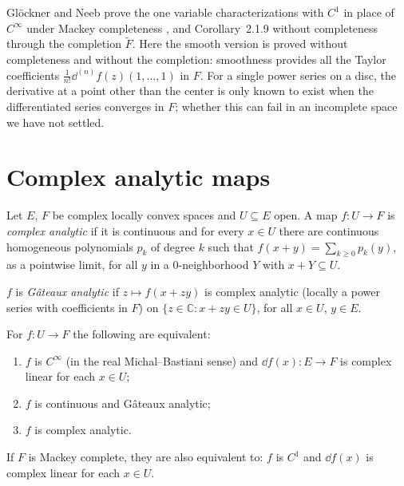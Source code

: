 \begin{remark}
  Glöckner and Neeb prove the one variable characterizations with $C^1$ in place of $C^\infty$
  under Mackey completeness \cite[Prop.~2.1.6]{GN26}, and Corollary~2.1.9 without completeness
  through the completion $\widetilde F$. Here the smooth version is proved without completeness
  and without the completion: smoothness provides all the Taylor coefficients
  $\frac{1}{n!}\dd^{(n)} f(z)(1, \dots, 1)$ in $F$. For a single power series on a disc, the
  derivative at a point other than the center is only known to exist when the differentiated
  series converges in $F$; whether this can fail in an incomplete space we have not settled.
\end{remark}

\section{Complex analytic maps}

\begin{definition}
  \label{def:complex-analytic}
  \leanok
  Let $E$, $F$ be complex locally convex spaces and $U \subseteq E$ open. A map
  $f \colon U \to F$ is \emph{complex analytic} if it is continuous and for every $x \in U$ there
  are continuous homogeneous polynomials $p_k$ of degree $k$ such that
  $f(x + y) = \sum_{k \ge 0} p_k(y)$, as a pointwise limit, for all $y$ in a $0$-neighborhood $Y$
  with $x + Y \subseteq U$.
\end{definition}

\begin{definition}
  \label{def:gateaux-analytic}
  \leanok
  $f$ is \emph{Gâteaux analytic} if $z \mapsto f(x + z y)$ is complex analytic (locally a power
  series with coefficients in $F$) on $\{z \in \mathbb{C} : x + zy \in U\}$, for all $x \in U$,
  $y \in E$.
\end{definition}

\begin{theorem}
  \label{thm:complex-analytic-iff}
  \leanok
  For $f \colon U \to F$ the following are equivalent:
  \begin{enumerate}
    \item $f$ is $C^\infty$ (in the real Michal--Bastiani sense) and $\dd f(x) \colon E \to F$ is
      complex linear for each $x \in U$;
    \item $f$ is continuous and Gâteaux analytic;
    \item $f$ is complex analytic.
  \end{enumerate}
  If $F$ is Mackey complete, they are also equivalent to: $f$ is $C^1$ and $\dd f(x)$ is complex
  linear for each $x \in U$.
\end{theorem}

